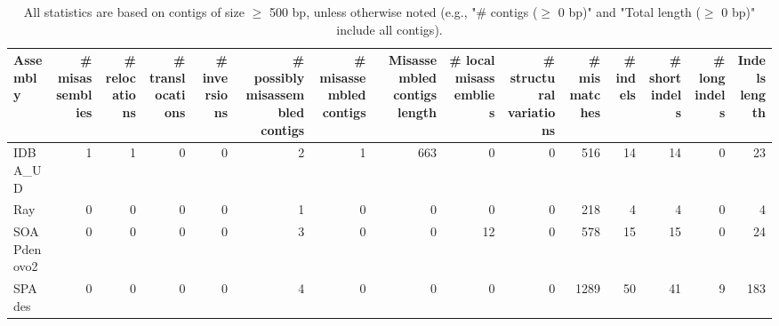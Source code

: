 \documentclass[12pt,a4paper]{article}
\begin{document}
\begin{table}[ht]
\begin{center}
\caption{All statistics are based on contigs of size $\geq$ 500 bp, unless otherwise noted (e.g., "\# contigs ($\geq$ 0 bp)" and "Total length ($\geq$ 0 bp)" include all contigs).}
\begin{tabular}{|l*{14}{|r}|}
\hline
Assembly & \# misassemblies &     \# relocations &     \# translocations &     \# inversions & \# possibly misassembled contigs & \# misassembled contigs & Misassembled contigs length & \# local misassemblies & \# structural variations & \# mismatches & \# indels &     \# short indels &     \# long indels & Indels length \\ \hline
IDBA\_UD & 1 & 1 & 0 & 0 & 2 & 1 & 663 & 0 & 0 & 516 & 14 & 14 & 0 & 23 \\ \hline
Ray & 0 & 0 & 0 & 0 & 1 & 0 & 0 & 0 & 0 & 218 & 4 & 4 & 0 & 4 \\ \hline
SOAPdenovo2 & 0 & 0 & 0 & 0 & 3 & 0 & 0 & 12 & 0 & 578 & 15 & 15 & 0 & 24 \\ \hline
SPAdes & 0 & 0 & 0 & 0 & 4 & 0 & 0 & 0 & 0 & 1289 & 50 & 41 & 9 & 183 \\ \hline
\end{tabular}
\end{center}
\end{table}
\end{document}

